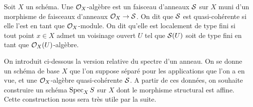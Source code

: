 \begin{defn}[$\Oo_X$-algèbre]
Soit $X$ un schéma. Une $\Oo_X$-algèbre est un faisceau d'anneaux $\mathcal{S}$ sur $X$ muni d'un morphisme de faisceaux d'anneaux $\mathcal{O}_X\rightarrow \mathcal{S}$. On dit que $\mathcal{S}$ est quasi-cohérente si elle l'est en tant que $\Oo_X$-module. On dit qu'elle est localement de type fini si tout point $x\in X$ admet un voisinage ouvert $U$ tel que $\mathcal{S}(U)$ soit de type fini en tant que $\mathcal{O}_X(U)$-algèbre.
\end{defn}

On introduit ci-dessous la version relative du spectre d'un anneau. On se donne un schéma de base $X$ que l'on suppose séparé pour les applications que l'on a en vue, et une $\Oo_X$-algèbre quasi-cohérente $\mathcal{S}$. A partir de ces données, on souhaite construire un schéma $\operatorname{Spec}_X S$ sur $X$ dont le morphisme structural est affine. Cette construction nous sera très utile par la suite.

